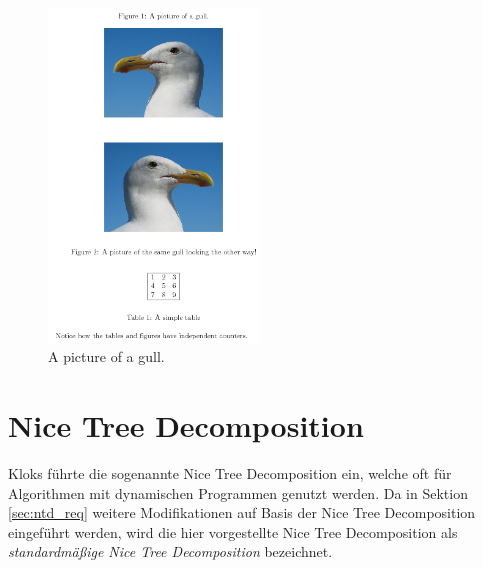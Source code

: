 \begin{figure}
\label{fig:td}

  \centering
    \includegraphics[width=0.5\textwidth]{pic.png}
  	\caption{A picture of a gull.}
\end{figure}


\section{Nice Tree Decomposition}
\label{sec:ntd_ntd}
Kloks\cite{kloks1994} führte die sogenannte Nice Tree Decomposition ein, welche oft für Algorithmen mit dynamischen Programmen genutzt werden. Da in Sektion \ref{sec:ntd_req} weitere Modifikationen auf Basis der Nice Tree Decomposition eingeführt werden, wird die hier vorgestellte Nice Tree Decomposition als \textit{standardmäßige Nice Tree Decomposition} bezeichnet.


